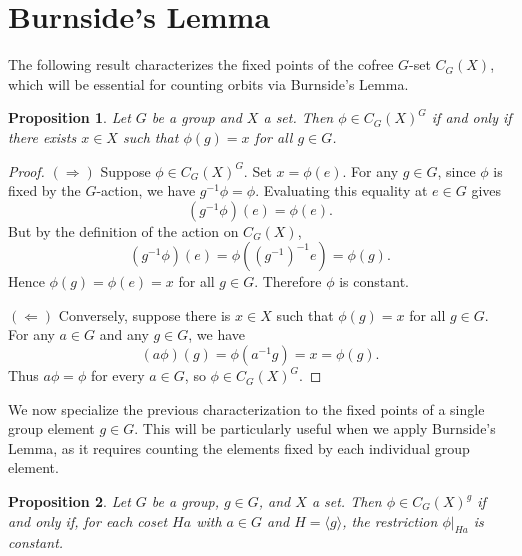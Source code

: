 \documentclass{amsart}
\newtheorem{proposition}{Proposition}
\begin{document}
\section{Burnside's Lemma}
\label{sec:burnside}

The following result characterizes the fixed points of the cofree $G$-set $C_G(X)$, which will be essential for counting orbits via Burnside's Lemma.

\begin{proposition}\label{prop:fixed_points_global}
Let $G$ be a group and $X$ a set. Then $\phi \in C_G(X)^G$ if and only if there exists $x \in X$ such that $\phi(g) = x$ for all $g \in G$.
\end{proposition}

\begin{proof}
$(\Rightarrow)$ Suppose $\phi \in C_G(X)^G$. Set $x = \phi(e)$. For any $g \in G$, since $\phi$ is fixed by the $G$-action, we have $g^{-1}\phi = \phi$. Evaluating this equality at $e \in G$ gives
\[
(g^{-1}\phi)(e) = \phi(e).
\]
But by the definition of the action on $C_G(X)$,
\[
(g^{-1}\phi)(e) = \phi((g^{-1})^{-1}e) = \phi(g).
\]
Hence $\phi(g) = \phi(e) = x$ for all $g \in G$. Therefore $\phi$ is constant.

$(\Leftarrow)$ Conversely, suppose there is $x \in X$ such that $\phi(g) = x$ for all $g \in G$. For any $a \in G$ and any $g \in G$, we have
\[
(a \phi)(g) = \phi(a^{-1}g) = x = \phi(g).
\]
Thus $a \phi = \phi$ for every $a \in G$, so $\phi \in C_G(X)^G$.
\end{proof}

We now specialize the previous characterization to the fixed points of a single group element $g \in G$. This will be particularly useful when we apply Burnside's Lemma, as it requires counting the elements fixed by each individual group element.

\begin{proposition}\label{prop:fixed_points_element}
Let $G$ be a group, $g \in G$, and $X$ a set. Then $\phi \in C_G(X)^g$ if and only if, for each coset $Ha$ with $a \in G$ and $H = \langle g \rangle$, the restriction $\phi|_{Ha}$ is constant.
\end{proposition}
\end{document}
